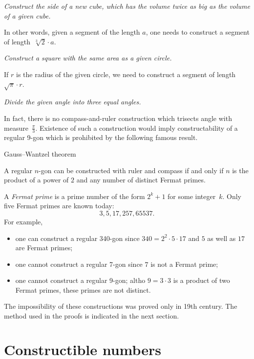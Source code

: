  {\it Construct the side of a new cube, 
which has the volume twice as big as the volume of a given cube.} 

\medskip

In other words, 
given a segment of the length $a$,
one needs to construct a segment of length~$\sqrt[3]{2}\cdot a$.

 {\it Construct a square with the same area as a given circle.} 

\medskip

If $r$ is the radius of the given circle, we need to construct a segment of length~$\sqrt{\pi}\cdot r$. 

{\it Divide the given angle into three equal angles.}

\medskip

In fact, there is no compass-and-ruler construction which trisects angle with measure~$\tfrac\pi3$. 
Existence of such a construction would imply constructability of a regular 9-gon which is prohibited by the following famous result.

\begin{thm}{Gauss--Wantzel theorem}
{\sloppy A regular $n$-gon can be constructed with ruler and compass 
if and only if 
$n$ is the product of a power of $2$ and any number of distinct Fermat primes.

}
\end{thm}

A \emph{Fermat prime} is a prime number of the form $2^k+1$ for some integer~$k$.
Only five Fermat primes are known  today:
$$3, 5, 17, 257, 65537.$$
For example, 
\begin{itemize}
\item one can construct a regular 340-gon since $340=2^2\cdot 5\cdot 17$ and $5$ as well as $17$ are Fermat primes;
\item one cannot construct a regular 7-gon since $7$ is not a Fermat prime;
\item one cannot construct a regular 9-gon; 
altho $9=3\cdot 3$ is a product of two Fermat primes, 
these primes are not distinct.
\end{itemize}

\medskip

The impossibility of these constructions 
was proved only in 19th century.
The method used in the proofs is indicated in the next section.

\section*{Constructible numbers}

